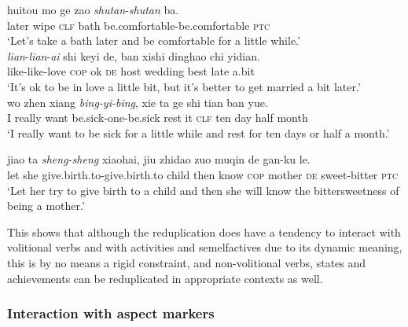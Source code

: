 \ex\label{ex:redup-achi-stat2}
\gll huitou mo ge zao \textit{shutan}-\textit{shutan} ba.\footnotemark\\
later wipe \textsc{clf} bath be.comfortable-be.comfortable \textsc{ptc}\\
\glt `Let's take a bath later and be comfortable for a little while.'\\

\ex\label{ex:redup-achi-stat3}
\gll \textit{lian}-\textit{lian}-\textit{ai} shi keyi de, ban xishi dinghao chi yidian.\footnotemark\\
like-like-love \textsc{cop} ok \textsc{de} host wedding best late a.bit\\
\glt `It's ok to be in love a little bit, but it's better to get married a bit later.'\\

\ex\label{ex:redup-achi-stat4}
\gll wo zhen xiang \textit{bing-yi-bing}, xie ta ge shi tian ban yue.\\
I really want be.sick-one-be.sick rest it \textsc{clf} ten day half month\\ 
\glt `I really want to be sick for a little while and rest for ten days or half a month.'

\ex\label{ex:redup-achi-stat5}
\gll jiao ta \textit{sheng-sheng} xiaohai, jiu zhidao zuo muqin de gan-ku le.\\
let she give.birth.to-give.birth.to child then know \textsc{cop} mother \textsc{de} sweet-bitter \textsc{ptc}\\ 
\glt `Let her try to give birth to a child and then she will know the bittersweetness of being a mother.'
\z
\z
{}


This shows that although the reduplication does have a tendency to interact with volitional verbs and with activities and semelfactives due to its dynamic meaning, 
this is by no means a rigid constraint, 
and non\hyp{}volitional verbs, states and achievements can be reduplicated in appropriate contexts as well.




\subsubsection{Interaction with aspect markers}\label{sec:aspM}


